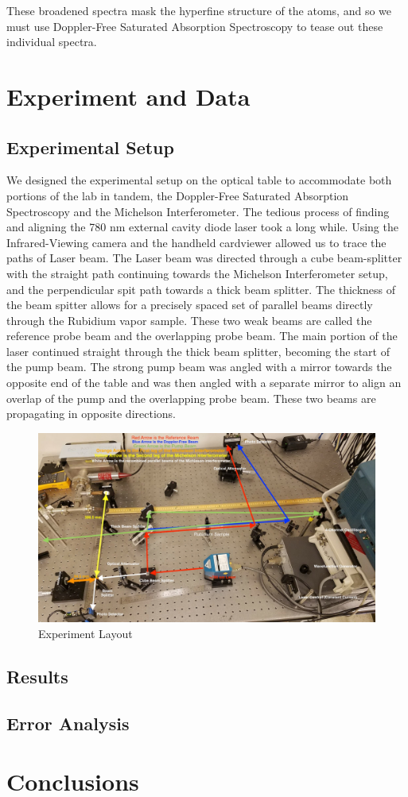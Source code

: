 \documentclass[12pt]{article}
\begin{document}
These broadened spectra mask the hyperfine structure of the atoms, and so we must use Doppler-Free Saturated Absorption Spectroscopy to tease out these individual spectra.



\section*{Experiment and Data}

\subsection*{Experimental Setup}
We designed the experimental setup on the optical table to accommodate both portions of the lab in tandem, the Doppler-Free Saturated Absorption Spectroscopy and the Michelson Interferometer. The tedious process of finding and aligning the 780 nm external cavity diode laser took a long while. Using the Infrared-Viewing camera and the handheld cardviewer allowed us to trace the paths of Laser beam. The Laser beam was directed through a cube beam-splitter with the straight path continuing towards the Michelson Interferometer setup, and the perpendicular spit path towards a thick beam splitter. The thickness of the beam spitter allows for a precisely spaced set of parallel beams directly through the Rubidium vapor sample. These two weak beams are called the reference probe beam and the overlapping probe beam. The main portion of the laser continued straight through the thick beam splitter, becoming the start of the pump beam. The strong pump beam was angled with a mirror towards the opposite end of the table and was then angled with a separate mirror to align an overlap of the pump and the overlapping probe beam. These two beams are propagating in opposite directions. 

\begin{figure}%
	\centering
	\includegraphics[width=\textwidth]{DFS_Layout.jpg}
	\caption{Experiment Layout}%
	\label{fig:Layout}%
\end{figure}

\subsection*{Results}

\subsection*{Error Analysis}

\section*{Conclusions}





\end{document}
